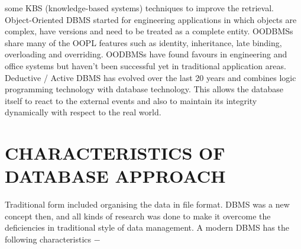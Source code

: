 some KBS (knowledge-based systems) techniques to improve the retrieval.
Object-Oriented DBMS started for engineering applications in which objects are complex, have
versions and need to be treated as a complete entity. OODBMSs share many of the OOPL features
such as identity, inheritance, late binding, overloading and overriding. OODBMSs have found
favours in engineering and office systems but haven’t been successful yet in traditional application
areas.
Deductive / Active DBMS has evolved over the last 20 years and combines logic programming
technology with database technology. This allows the database itself to react to the external events
and also to maintain its integrity dynamically with respect to the real world.

\section{ CHARACTERISTICS OF DATABASE APPROACH}
Traditional form included organising the data in file format. DBMS was a new concept then, and
all kinds of research was done to make it overcome the deficiencies in traditional style of data
management. A modern DBMS has the following characteristics −
